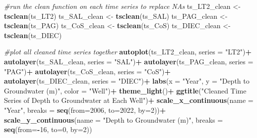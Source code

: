 \documentclass[
]{article}
\newenvironment{Shaded}{\begin{snugshade}}{\end{snugshade}}
\newcommand{\AttributeTok}[1]{\textcolor[rgb]{0.13,0.29,0.53}{#1}}
\newcommand{\CommentTok}[1]{\textcolor[rgb]{0.56,0.35,0.01}{\textit{#1}}}
\newcommand{\DecValTok}[1]{\textcolor[rgb]{0.00,0.00,0.81}{#1}}
\newcommand{\FunctionTok}[1]{\textcolor[rgb]{0.13,0.29,0.53}{\textbf{#1}}}
\newcommand{\NormalTok}[1]{#1}
\newcommand{\OtherTok}[1]{\textcolor[rgb]{0.56,0.35,0.01}{#1}}
\newcommand{\SpecialCharTok}[1]{\textcolor[rgb]{0.81,0.36,0.00}{\textbf{#1}}}
\newcommand{\StringTok}[1]{\textcolor[rgb]{0.31,0.60,0.02}{#1}}
\begin{document}
\begin{Shaded}
\begin{Highlighting}[]
\CommentTok{\#run the clean function on each time series to replace NAs}
\NormalTok{ts\_LT2\_clean }\OtherTok{\textless{}{-}} \FunctionTok{tsclean}\NormalTok{(ts\_LT2)}
\NormalTok{ts\_SAL\_clean }\OtherTok{\textless{}{-}} \FunctionTok{tsclean}\NormalTok{(ts\_SAL)}
\NormalTok{ts\_PAG\_clean }\OtherTok{\textless{}{-}} \FunctionTok{tsclean}\NormalTok{(ts\_PAG)}
\NormalTok{ts\_CoS\_clean }\OtherTok{\textless{}{-}} \FunctionTok{tsclean}\NormalTok{(ts\_CoS)}
\NormalTok{ts\_DIEC\_clean }\OtherTok{\textless{}{-}} \FunctionTok{tsclean}\NormalTok{(ts\_DIEC)}

\CommentTok{\#plot all cleaned time series together}
\FunctionTok{autoplot}\NormalTok{(ts\_LT2\_clean, }\AttributeTok{series =} \StringTok{"LT2"}\NormalTok{)}\SpecialCharTok{+}
  \FunctionTok{autolayer}\NormalTok{(ts\_SAL\_clean, }\AttributeTok{series =} \StringTok{"SAL"}\NormalTok{)}\SpecialCharTok{+}
  \FunctionTok{autolayer}\NormalTok{(ts\_PAG\_clean, }\AttributeTok{series =} \StringTok{"PAG"}\NormalTok{)}\SpecialCharTok{+}
  \FunctionTok{autolayer}\NormalTok{(ts\_CoS\_clean, }\AttributeTok{series =} \StringTok{"CoS"}\NormalTok{)}\SpecialCharTok{+}
  \FunctionTok{autolayer}\NormalTok{(ts\_DIEC\_clean, }\AttributeTok{series =} \StringTok{"DIEC"}\NormalTok{)}\SpecialCharTok{+}
  \FunctionTok{labs}\NormalTok{(}\AttributeTok{x =} \StringTok{"Year"}\NormalTok{, }\AttributeTok{y =} \StringTok{"Depth to Groundwater (m)"}\NormalTok{, }\AttributeTok{color =} \StringTok{"Well"}\NormalTok{)}\SpecialCharTok{+}
  \FunctionTok{theme\_light}\NormalTok{()}\SpecialCharTok{+}
  \FunctionTok{ggtitle}\NormalTok{(}\StringTok{"Cleaned Time Series of Depth to Groundwater at Each Well"}\NormalTok{)}\SpecialCharTok{+}
  \FunctionTok{scale\_x\_continuous}\NormalTok{(}\AttributeTok{name =} \StringTok{"Year"}\NormalTok{, }\AttributeTok{breaks =} \FunctionTok{seq}\NormalTok{(}\AttributeTok{from=}\DecValTok{2006}\NormalTok{, }\AttributeTok{to=}\DecValTok{2022}\NormalTok{, }\AttributeTok{by=}\DecValTok{2}\NormalTok{))}\SpecialCharTok{+}
  \FunctionTok{scale\_y\_continuous}\NormalTok{(}\AttributeTok{name =} \StringTok{"Depth to Groundwater (m)"}\NormalTok{, }
                     \AttributeTok{breaks =} \FunctionTok{seq}\NormalTok{(}\AttributeTok{from=}\SpecialCharTok{{-}}\DecValTok{16}\NormalTok{, }\AttributeTok{to=}\DecValTok{0}\NormalTok{, }\AttributeTok{by=}\DecValTok{2}\NormalTok{))}
\end{Highlighting}
\end{Shaded}
\end{document}
